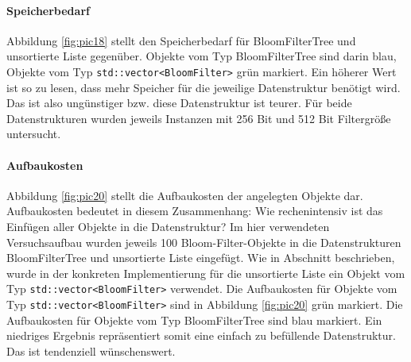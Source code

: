 \paragraph*{Speicherbedarf}
Abbildung \ref{fig:pic18} stellt den Speicherbedarf für BloomFilterTree und unsortierte Liste gegenüber. Objekte vom Typ BloomFilterTree sind darin blau, Objekte vom Typ \texttt{std::vector<BloomFilter>} grün markiert. Ein höherer Wert ist so zu lesen, dass mehr Speicher für die jeweilige Datenstruktur benötigt wird. Das ist also ungünstiger bzw. diese Datenstruktur ist teurer. Für beide Datenstrukturen wurden jeweils Instanzen mit 256 Bit und 512 Bit Filtergröße untersucht. 
\paragraph*{Aufbaukosten}
Abbildung \ref{fig:pic20} stellt die Aufbaukosten der angelegten Objekte dar. Aufbaukosten bedeutet in diesem Zusammenhang: Wie rechenintensiv ist das Einfügen aller Objekte in die Datenstruktur? Im hier verwendeten Versuchsaufbau wurden jeweils 100 Bloom-Filter-Objekte in die Datenstrukturen BloomFilterTree und unsortierte Liste eingefügt. Wie in Abschnitt beschrieben, wurde in der konkreten Implementierung für die unsortierte Liste ein Objekt vom Typ \texttt{std::vector<BloomFilter>} verwendet. Die Aufbaukosten für Objekte vom Typ \texttt{std::vector<BloomFilter>} sind in Abbildung \ref{fig:pic20} grün markiert. Die Aufbaukosten für Objekte vom Typ BloomFilterTree sind blau markiert. Ein niedriges Ergebnis repräsentiert somit eine einfach zu befüllende Datenstruktur. Das ist tendenziell wünschenswert. 
